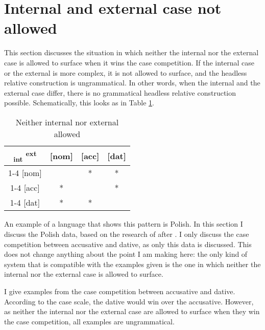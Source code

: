 \section{Internal and external case not allowed}\label{sec:pattern-iv}

This section discusses the situation in which neither the internal nor the external case is allowed to surface when it wins the case competition. If the internal case or the external is more complex, it is not allowed to surface, and the headless relative construction is ungrammatical. In other words, when the internal and the external case differ, there is no grammatical headless relative construction possible. Schematically, this looks as in Table \ref{tbl:case-competition-none-repeated}.

\begin{table}[H]
  \center
  \caption{Neither internal nor external allowed}
  \begin{tabular}{c|c|c|c}
    \toprule
    \textsubscript{\ac{int}} \textsuperscript{\ac{ext}}
           & [\ac{nom}]
           & [\ac{acc}]
           & [\ac{dat}]
           \\ \cmidrule{1-4}
       [\ac{nom}]
           & \xcancel{\phantom{xx}}
           & *
           & *
           \\ \cmidrule{1-4}
       [\ac{acc}]
           & *
           & \xcancel{\phantom{xx}}
           & *
           \\ \cmidrule{1-4}
       [\ac{dat}]
           & *
           & *
           & \xcancel{\phantom{xx}}
           \\
     \bottomrule
  \end{tabular}
    \label{tbl:case-competition-none-repeated}
\end{table}

An example of a language that shows this pattern is Polish. In this section I discuss the Polish data, based on the research of \citet{citko2013} after \citet{himmelreich2017}. I only discuss the case competition between accusative and dative, as only this data is discussed. This does not change anything about the point I am making here: the only kind of system that is compatible with the examples given is the one in which neither the internal nor the external case is allowed to surface.

I give examples from the case competition between accusative and dative. According to the case scale, the dative would win over the accusative. However, as neither the internal nor the external case are allowed to surface when they win the case competition, all examples are ungrammatical.

